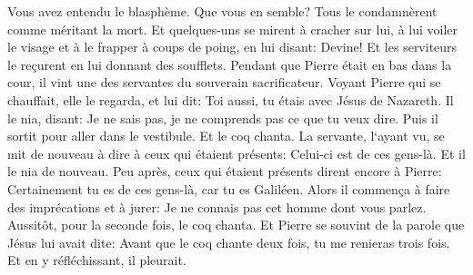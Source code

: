 \verse Vous avez entendu le blasphème. Que vous en semble? Tous le condamnèrent comme méritant la mort. 
\verse Et quelques-uns se mirent à cracher sur lui, à lui voiler le visage et à le frapper à coups de poing, en lui disant: Devine! Et les serviteurs le reçurent en lui donnant des soufflets. 
\verse Pendant que Pierre était en bas dans la cour, il vint une des servantes du souverain sacrificateur. 
\verse Voyant Pierre qui se chauffait, elle le regarda, et lui dit: Toi aussi, tu étais avec Jésus de Nazareth. 
\verse Il le nia, disant: Je ne sais pas, je ne comprends pas ce que tu veux dire. Puis il sortit pour aller dans le vestibule. Et le coq chanta. 
\verse La servante, l`ayant vu, se mit de nouveau à dire à ceux qui étaient présents: Celui-ci est de ces gens-là. Et il le nia de nouveau. 
\verse Peu après, ceux qui étaient présents dirent encore à Pierre: Certainement tu es de ces gens-là, car tu es Galiléen. 
\verse Alors il commença à faire des imprécations et à jurer: Je ne connais pas cet homme dont vous parlez. 
\verse Aussitôt, pour la seconde fois, le coq chanta. Et Pierre se souvint de la parole que Jésus lui avait dite: Avant que le coq chante deux fois, tu me renieras trois fois. Et en y réfléchissant, il pleurait. 

\chapter{}

